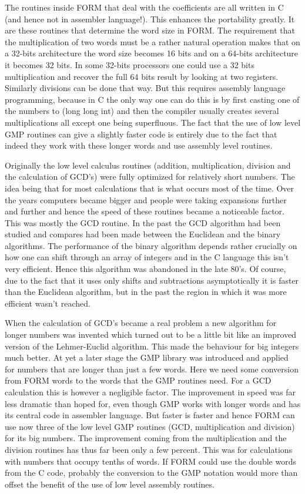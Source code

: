 


The routines inside FORM that deal with the coefficients are all written in 
C (and hence not in assembler language!). This enhances the portability 
greatly. It are these routines that determine the word size in FORM. The 
requirement that the multiplication of two words must be a rather natural 
operation makes that on a 32-bits architecture the word size becomes 16 
bits and on a 64-bits architecture it becomes 32 bits. In some 32-bits 
processors one could use a 32 bits multiplication and recover the full 64 
bits result by looking at two registers. Similarly divisions can be done 
that way. But this requires assembly language programming, because in C the 
only way one can do this is by first casting one of the numbers to (long 
long int) and then the compiler usually creates several multiplications all 
except one being superfluous. The fact that the use of low level GMP 
routines can give a slightly faster code is entirely due to the fact that 
indeed they work with these longer words and use assembly level routines.

Originally the low level calculus routines (addition, multiplication, 
division and the calculation of GCD's) were fully optimized for relatively 
short numbers. The idea being that for most calculations that is what 
occurs most of the time. Over the years computers became bigger and people 
were taking expansions further and further and hence the speed of these 
routines became a noticeable factor. This was mostly the GCD routine. In 
the past the GCD algorithm had been studied and compares had been made 
between the Euclidean and the binary algorithms. The performance of the 
binary algorithm depends rather crucially on how one can shift through an 
array of integers and in the C language this isn't very efficient. Hence 
this algorithm was abandoned in the late 80's. Of course, due to the fact 
that it uses only shifts and subtractions asymptotically it is faster than 
the Euclidean algorithm, but in the past the region in which it was more 
efficient wasn't reached.

When the calculation of GCD's became a real problem a new algorithm for 
longer numbers was invented which turned out to be a little bit like an 
improved version of the Lehmer-Euclid algorithm. This made the behaviour 
for big integers much better. At yet a later stage the GMP library was 
introduced and applied for numbers that are longer than just a few words. 
Here we need some conversion from FORM words to the words that the GMP 
routines need. For a GCD calculation this is however a negligible factor. 
The improvement in speed was far less dramatic than hoped for, even though 
GMP works with longer words and has its central code in assembler language. 
But faster is faster and hence FORM can use now three of the low level GMP 
routines (GCD, multiplication and division) for its big numbers. The 
improvement coming from the multiplication and the division routines has 
thus far been only a few percent. This was for calculations with numbers 
that occupy tenths of words. If FORM could use the double words from the C 
code, probably the conversion to the GMP notation would more than offset 
the benefit of the use of low level assembly routines.

